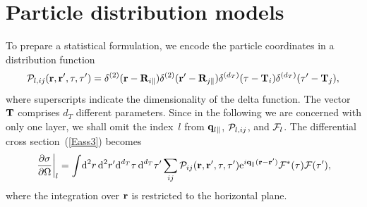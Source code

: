 \section{Particle distribution models}

To prepare a statistical formulation,
we encode the particle coordinates in a distribution function
%
%
%
\begin{equation}\label{EPDdeltas}
  \mathcal{P}_{l,ij}(\mathbf{r},\mathbf{r}',\mathbf{\tau},\mathbf{\tau}')
  = \delta^{(2)}(\mathbf{r}-\mathbf{R}_{i\parallel})\delta^{(2)}(\mathbf{r}'-\mathbf{R}_{j\parallel})
  \delta^{(d_T)}(\mathbf{\tau}-\mathbf{T}_i)\delta^{(d_T)}(\mathbf{\tau}'-\mathbf{T}_j),
\end{equation}
where superscripts indicate the dimensionality of the delta function.
The vector~$\mathbf{T}$ comprises $d_T$ different parameters.
Since in the following we are concerned with only one layer,
we shall omit the index~$l$ from $\mathbf{q}_{l\parallel}$, $\mathcal{P}_{l,ij}$, and $\mathcal{F}_l$.
The differential cross section~(\ref{Eass3}) becomes
\begin{equation}\label{Epdm1}
  \left.\frac{\partial\sigma}{\partial\Omega}\right|_l
  = 
  \int\!\text{d}^2r\, \text{d}^2r' \text{d}^{d_T}\tau\, \text{d}^{d_T}\tau'
    \sum_{ij}\mathcal{P}_{ij}(\mathbf{r},\mathbf{r}',\mathbf{\tau},\mathbf{\tau}')
  \text{e}^{i\mathbf{q}_{\parallel}(\mathbf{r}-\mathbf{r}')}
    \mathcal{F}^*(\mathbf{\tau}) \mathcal{F}(\mathbf{\tau}'),
\end{equation}
where the integration over $\mathbf{r}$ is restricted to the horizontal plane.



